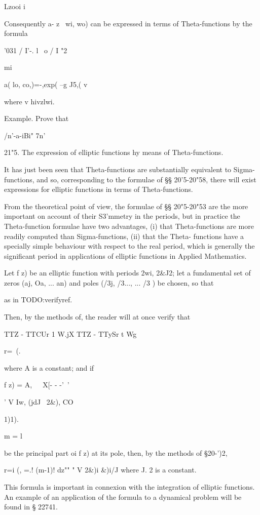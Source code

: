 Lzooi i

Consequently a- z \ wi, wo) can be expressed in terms of
Theta-functions by the formula

'031 / I'-. l \ o / I "2

mi

a( lo, co,)=-,exp( --g J5,( v

where v hivzlwi.

Example. Prove that

/n'-a-iBi" 7n'\

21"5. The expression of elliptic functions hy means of
Theta-functions.

It has just been seen that Theta-functions are substantially
equivalent to Sigma-functions, and so, corresponding to the formulae
of §§ 20'5-20"58, there will exist expressions for elliptic functions
in terms of Theta-functions.

%
%

From the theoretical point of view, the formulae of §§ 20"5-20"53 are
the more important on account of their S3'mmetry in the periods, but
in practice the Theta-function formulae have two advantages, (i) that
Theta-functions are more readily computed than Sigma-functions, (ii)
that the Theta- functions have a specially simple behaviour with
respect to the real period, which is generally the significant period
in applications of elliptic functions in Applied Mathematics.

Let f z) be an elliptic function with periods 2wi, 2\&J2; let a
fundamental set of zeros (aj, Oa, ... an) and poles (/3j, /3..., ...
/3 ) be chosen, so that

as in TODO:verifyref.

Then, by the methods of, the reader will at once verify that

TTZ - TTCUr 1 W.jX TTZ - TTySr t Wg

r=\ (.

where A is a constant; and if

f z) = A,\ \ \ X[- - -'~' \ \ %

' V Iw, (jdJ \ 2\&), CO

1)1).

m = l

be the principal part oi f z) at its pole, then, by the methods of
§20-')2,

r=i (, =.! (m-1)! dz"" " V 2\&)i \&)i/J where J. 2 is a constant.

This formula is important in connexion with the integration of
elliptic functions. An example of an application of the formula to a
dynamical problem will be found in § 22741.

